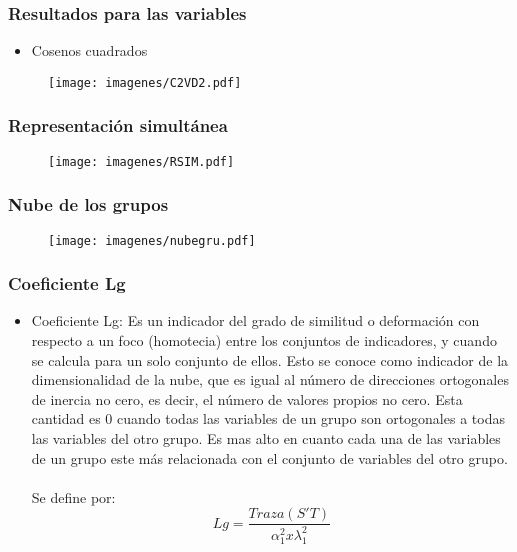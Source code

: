 \documentclass[12pt]{beamer}
\begin{document}
\begin{frame}
\frametitle{Resultados para las variables}
\begin{itemize}
\item Cosenos cuadrados
\end{itemize}
\begin{figure}[h]
  \centering
  \texttt{[image: imagenes/C2VD2.pdf]}
\end{figure}
\end{frame}


\begin{frame}
\frametitle{Representación simultánea}
\begin{figure}[h]
  \centering
  \texttt{[image: imagenes/RSIM.pdf]}
\end{figure}
\end{frame}

\begin{frame}
\frametitle{Nube de los grupos}
\begin{figure}[h]
  \centering
  \texttt{[image: imagenes/nubegru.pdf]}
\end{figure}
\end{frame}

\begin{frame}
\frametitle{Coeficiente Lg}
\begin{itemize}
\justifying
\item Coeficiente Lg: Es un indicador del grado de similitud o deformación con respecto a un foco (homotecia) entre los conjuntos
de indicadores, y cuando se calcula para un solo conjunto de ellos. Esto se conoce como indicador de la dimensionalidad de la nube, que es igual al número de direcciones ortogonales de inercia no cero, es decir, el número de valores propios no cero. Esta cantidad es 0 cuando todas las variables de un grupo son ortogonales a todas las variables del otro grupo. Es mas alto en cuanto cada una de las variables de un grupo este más relacionada con el conjunto de variables del otro grupo.
~\\Se define por:
$$Lg=\frac{Traza(S'T)}{\alpha_1^2 x \lambda_1^2}$$
\end{itemize}
\end{frame}
\end{document}
